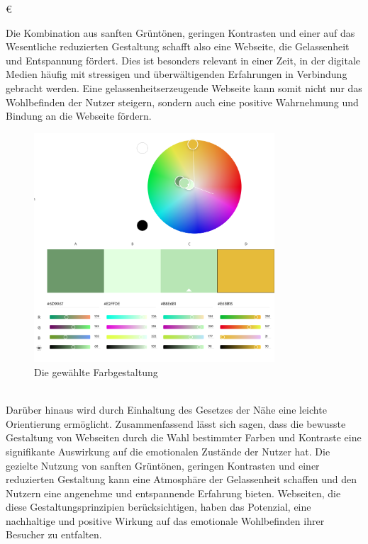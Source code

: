 €\documentclass[./dokumentation.tex]{subfiles}
\begin{document}
Die Kombination aus sanften Grüntönen, geringen Kontrasten und einer auf das Wesentliche reduzierten Gestaltung schafft also eine Webseite, die Gelassenheit und Entspannung fördert. Dies ist besonders relevant in einer Zeit, in der digitale Medien häufig mit stressigen und überwältigenden Erfahrungen in Verbindung gebracht werden. Eine gelassenheitserzeugende Webseite kann somit nicht nur das Wohlbefinden der Nutzer steigern, sondern auch eine positive Wahrnehmung und Bindung an die Webseite fördern.\\


\begin{figure}[H]
    \centering
    \includegraphics[width=0.8\textwidth]{bilder/adobecolor.png}
    \caption{Die gewählte Farbgestaltung}
    \label{fig22:adobecolor}
\end{figure}\\

Darüber hinaus wird durch Einhaltung des Gesetzes der Nähe eine leichte Orientierung ermöglicht.  Zusammenfassend lässt sich sagen, dass die bewusste Gestaltung von Webseiten durch die Wahl bestimmter Farben und Kontraste eine signifikante Auswirkung auf die emotionalen Zustände der Nutzer hat. Die gezielte Nutzung von sanften Grüntönen, geringen Kontrasten und einer reduzierten Gestaltung kann eine Atmosphäre der Gelassenheit schaffen und den Nutzern eine angenehme und entspannende Erfahrung bieten. Webseiten, die diese Gestaltungsprinzipien berücksichtigen, haben das Potenzial, eine nachhaltige und positive Wirkung auf das emotionale Wohlbefinden ihrer Besucher zu entfalten.\\
\end{document}
